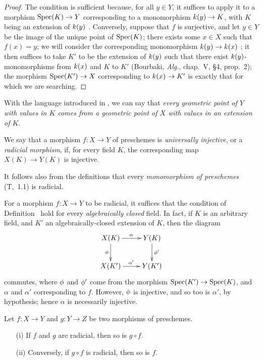 \begin{proof}
\label{proof-prof-1.3.5.3}
The condition is sufficient because, for all $y\in Y$, it suffices to apply it to a morphism $\Spec(K)\to Y$ corresponding to a monomorphism $\kres(y)\to K$, with $K$ being an extension of $k(y)$ .
Conversely, suppose that $f$ is surjective, and let $y\in Y$ be the image of the unique point of $\operatorname{Spec}(K)$; there exists some $x\in X$ such that $f(x)=y$; we will consider the corresponding monomorphism $\kres(y)\to\kres(x)$ ; it then suffices to take $K'$ to be the extension of $k(y)$ such that there exist $k(y)$-monomorphisms from $k(x)$ and $K$ to $K'$ (Bourbaki, \emph{Alg.}, chap.~V, §4, prop.~2); the morphism $\Spec(K')\to X$ corresponding to $\kres(x)\to K'$ is exactly that for which we are searching.
\end{proof}

With the language introduced in , we can say that \emph{every geometric point of $Y$ with values in $K$ comes from a geometric point of $X$ with values in an extension of $K$}.

\begin{definition}[3.5.4]
\label{1.3.5.4}
We say that a morphism $f:X\to Y$ of preschemes is \emph{universally injective}, or a \emph{radicial morphism}, if, for every field $K$, the corresponding map $X(K)\to Y(K)$ is injective.
\end{definition}

It follows also from the definitions that every \emph{monomorphism of preschemes} (T,~1.1) is radicial.

\begin{env}[3.5.5]
\label{1.3.5.5}
For a morphism $f:X\to Y$ to be radicial, it suffices that the condition of Definition~ hold for every \emph{algebraically closed} field.
In fact, if $K$ is an arbitrary field, and $K'$ an algebraically-closed extension of $K$, then the diagram
\[
  \xymatrix{
    X(K)\ar[r]^\alpha\ar[d]_\vphi &
    Y(K)\ar[d]^{\vphi'}\\
    X(K')\ar[r]^{\alpha'} &
    Y(K')
  }
\]
commutes, where $\phi$ and $\phi'$ come from the morphism $\Spec(K')\to\Spec(K)$, and $\alpha$ and $\alpha'$ corresponding to $f$.
However, $\phi$ is injective, and so too is $\alpha'$, by hypothesis; hence $\alpha$ is necessarily injective.
\end{env}

\begin{proposition}[3.5.6]
\label{1.3.5.6}
Let $f:X\to Y$ and $g:Y\to Z$ be two morphisms of preschemes.
\begin{enumerate}
  \item[{\rm(i)}] If $f$ and $g$ are radicial, then so is $g\circ f$.
  \item[{\rm(ii)}] Conversely, if $g\circ f$ is radicial, then so is $f$.
\end{enumerate}
\end{proposition}

